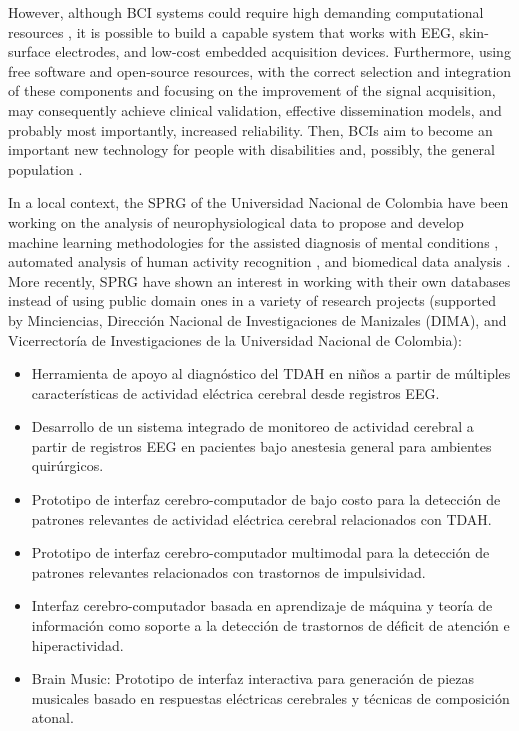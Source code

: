However, although \gls*{BCI} systems could require high demanding computational resources \cite{kostiukevych2021convolutional}, it is possible to build a capable system that works with \gls*{EEG}, skin-surface electrodes, and low-cost embedded acquisition devices. Furthermore, using free software and open-source resources, with the correct selection and integration of these components and focusing on the improvement of the signal acquisition, may consequently achieve clinical validation, effective dissemination models, and probably most importantly, increased reliability. Then, \gls*{BCI}s aim to become an important new technology for people with disabilities and, possibly, the general population \cite{wolpaw2012brain}.

In a local context, the \gls*{SPRG} of the Universidad Nacional de Colombia have been working on the analysis of neurophysiological data to propose and develop machine learning methodologies for the assisted diagnosis of mental conditions \cite{cardenas2017enhanced, collazos2019instance}, automated analysis of human activity recognition \cite{pulgarin2017relevant}, and biomedical data analysis \cite{hurtado2016identification}. More recently, SPRG have shown an interest in working with their own databases instead of using public domain ones in a variety of research projects (supported by Minciencias, Dirección Nacional de Investigaciones de Manizales (DIMA), and Vicerrectoría de Investigaciones de la Universidad Nacional de Colombia):

    

\begin{itemize}

    \item Herramienta de apoyo al diagnóstico del TDAH en niños a partir de múltiples características de actividad eléctrica cerebral desde registros \gls*{EEG}.

    \item Desarrollo de un sistema integrado de monitoreo de actividad cerebral a partir de registros \gls*{EEG} en pacientes bajo anestesia general para ambientes quirúrgicos.

    \item Prototipo de interfaz cerebro-computador de bajo costo para la detección de patrones relevantes de actividad eléctrica cerebral relacionados con TDAH.

    \item Prototipo de interfaz cerebro-computador multimodal para la detección de patrones relevantes relacionados con trastornos de impulsividad.

    \item Interfaz cerebro-computador basada en aprendizaje de máquina y teoría de información como soporte a la detección de trastornos de déficit de atención e hiperactividad.

    \item Brain Music: Prototipo de interfaz interactiva para generación de piezas musicales basado en respuestas eléctricas cerebrales y técnicas de composición atonal.

\end{itemize}



